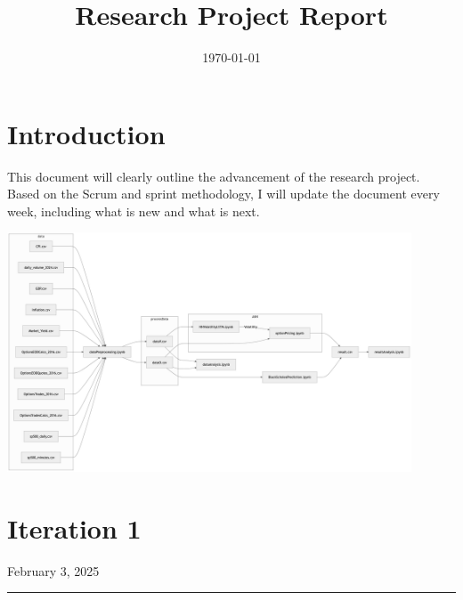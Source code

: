 \documentclass[letterpaper,11pt]{article}
\title{\textbf{Research Project Report}}
\author{}
\date{\today}
\begin{document}
\maketitle
\hrulefill
\vfill

\section{Introduction}
This document will clearly outline the advancement of the research project. Based on the Scrum and sprint methodology, I will update the document every week, including what is new and what is next.
			\begin{center}
            \includegraphics[width=0.9\textwidth]{img/structure.png}
            \end{center}

\newpage
\section*{Iteration 1}
\begin{flushright}
February 3, 2025
\end{flushright}
\hrule
\vspace{0.2in}
\end{document}
